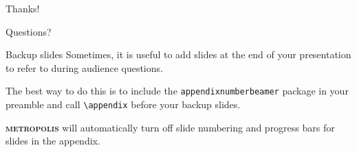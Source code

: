 \documentclass[10pt]{beamer}
\newcommand{\themename}{\textbf{\textsc{metropolis}}\xspace}
\begin{document}
\begin{frame}
    \begin{center}
        {\Huge\calligra Thanks!}
    \end{center}
\end{frame}
{
\begin{frame}[standout]
  Questions?
\end{frame}
}

\appendix

\begin{frame}[fragile]{Backup slides}
  Sometimes, it is useful to add slides at the end of your presentation to
  refer to during audience questions.

  The best way to do this is to include the \verb|appendixnumberbeamer|
  package in your preamble and call \verb|\appendix| before your backup slides.

  \themename will automatically turn off slide numbering and progress bars for
  slides in the appendix.
\end{frame}


%   
%   

\end{document}
